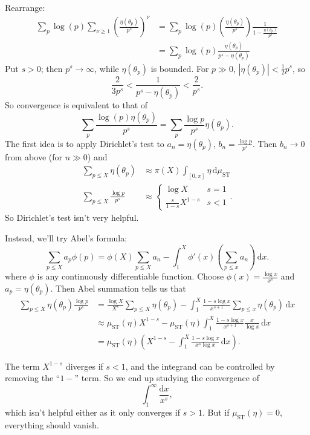 \documentclass{article}
\DeclareMathOperator{\ST}{ST}
\newcommand{\dd}{\mathrm{d}}
\numberwithin{theorem}{section}
\begin{document}
Rearrange:
\begin{align*}
	\sum_p \log(p) \sum_{\nu \geqslant 1} \left(\frac{\eta(\theta_p)}{p^s}\right)^\nu
	&= \sum_p \log(p) \left(\frac{\eta(\theta_p)}{p^s}\right)\frac{1}{1-\frac{\eta(\theta_p)}{p^s}} \\
	&= \sum_p \log(p) \frac{\eta(\theta_p)}{p^s-\eta(\theta_p)}
\end{align*}
Put $s>0$; then $p^s\to \infty$, while $\eta(\theta_p)$ is bounded. For 
$p\gg 0$, $|\eta(\theta_p)| < \frac{1}{2} p^s$, so 
\[
	\frac{2}{3p^s} < \frac{1}{p^s-\eta(\theta_p)} < \frac{2}{p^s} .
\]
So convergence is equivalent to that of 
\[
	\sum_p \frac{\log(p) \eta(\theta_p)}{p^s} = \sum_p \frac{\log p}{p^s} \eta(\theta_p) .
\]
The first idea is to apply Dirichlet's test to $a_n=\eta(\theta_p)$, 
$b_n=\frac{\log p}{p^s}$. Then $b_n\to 0$ from above (for $n\gg 0$) and 
\begin{align*}
	\sum_{p\leqslant X} \eta(\theta_p) &\approx \pi(X) \int_{[0,\pi]} \eta \, \dd \mu_{\ST} \\
	\sum_{p\leqslant X} \frac{\log p}{p^s} &\approx \begin{cases} \log X & s=1 \\ \frac{s}{1-s} X^{1-s} & s<1 \end{cases} .
\end{align*}
So Dirichlet's test isn't very helpful. 

Instead, we'll try Abel's formula:
\[
	\sum_{p\leqslant X} a_p \phi(p) = \phi(X) \sum_{p\leqslant X} a_n - \int_1^X \phi'(x) \left(\sum_{p\leqslant x} a_n \right) \, \dd x .
\]
where $\phi$ is any continuously differentiable function. Choose 
$\phi(x)=\frac{\log x}{x^s}$ and $a_p = \eta(\theta_p)$. Then Abel summation 
tells us that 
\begin{align*}
	\sum_{p\leqslant X} \eta(\theta_p) \frac{\log p}{p^s} 
	&= \frac{\log X}{X^s} \sum_{p\leqslant X} \eta(\theta_p) - \int_1^X \frac{1-s\log x}{x^{s+1}} \sum_{p\leqslant x} \eta(\theta_p) \, \dd x \\
&\approx \mu_{\ST}(\eta)X^{1-s} - \mu_{\ST}(\eta) \int_1^X \frac{1-s\log x}{x^{s+1}} \frac{x}{\log x} \, \dd x \\
	&= \mu_{\ST}(\eta) \left(X^{1-s} - \int_1^X \frac{1-s\log x}{x^s\log x}\, \dd x \right) .
\end{align*}

The term $X^{1-s}$ diverges if $s<1$, and the integrand can be controlled by 
removing the ``$1-$'' term. So we end up studying the convergence of 
\[
	\int_1^\infty \frac{\dd x}{x^s} ,
\]
which isn't helpful either as it only converges if $s>1$. But if 
$\mu_{\ST}(\eta)=0$, everything should vanish. 
\end{document}
